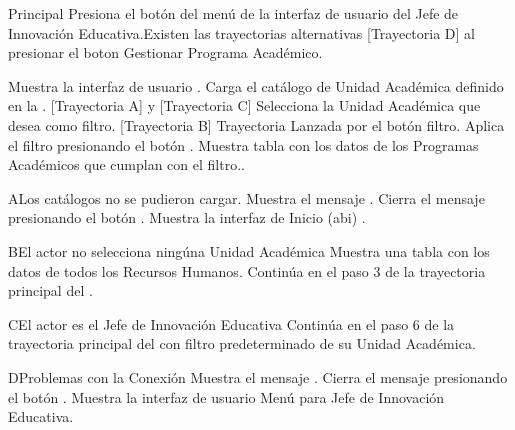 \begin{UCtrayectoria}{Principal}
    \UCpaso[\UCactor] Presiona el botón  del menú de la interfaz de usuario del Jefe de Innovación Educativa.Existen las trayectorias alternativas [Trayectoria D] al presionar el boton Gestionar Programa Académico.
    
    \UCpaso Muestra la interfaz de usuario .
    \UCpaso Carga el catálogo de Unidad Académica definido en la . [Trayectoria A] y [Trayectoria C]
    \UCpaso[\UCactor] Selecciona la Unidad Académica que desea como filtro. [Trayectoria B] Trayectoria Lanzada por el botón filtro.
    \UCpaso[\UCactor] Aplica el filtro presionando el botón .
    \UCpaso Muestra tabla con los datos de los Programas Académicos que cumplan con el filtro..
\end{UCtrayectoria}
\begin{UCtrayectoriaA}{A}{Los catálogos no se pudieron cargar.}
    \UCpaso Muestra el mensaje .
    \UCpaso[\UCactor] Cierra el mensaje presionando el botón .
    \UCpaso Muestra la interfaz de Inicio (abi) .
\end{UCtrayectoriaA}
\begin{UCtrayectoriaA}{B}{El actor no selecciona ningúna Unidad Académica}
    \UCpaso Muestra una tabla con los datos de todos los Recursos Humanos.
    \UCpaso Continúa en el paso 3 de la trayectoria principal del .
\end{UCtrayectoriaA}
\begin{UCtrayectoriaA}{C}{El actor es el Jefe de Innovación Educativa}
    \UCpaso Continúa en el paso 6 de la trayectoria principal del  con filtro predeterminado de su Unidad Académica.
\end{UCtrayectoriaA}

\begin{UCtrayectoriaA}{D}{Problemas con la Conexión}
    \UCpaso Muestra el mensaje .
    \UCpaso[\UCactor] Cierra el mensaje presionando el botón .
\UCpaso Muestra la interfaz de usuario Menú para Jefe de Innovación Educativa.
\end{UCtrayectoriaA}